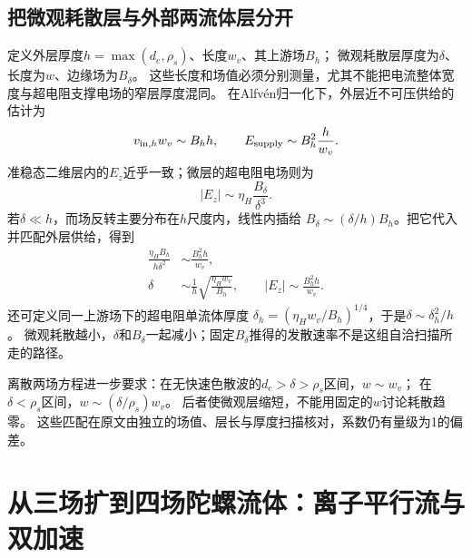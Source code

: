 \documentclass[UTF8,a4paper,11pt,openany,fontset=fandol]{ctexbook}
\begin{document}
\subsection{把微观耗散层与外部两流体层分开}
定义外层厚度$h=\max(d_e,\rho_s)$、长度$w_v$、其上游场$B_h$；
微观耗散层厚度为$\delta$、长度为$w$、边缘场为$B_\delta$。
这些长度和场值必须分别测量，尤其不能把电流整体宽度与超电阻支撑电场的窄层厚度混同。
在Alfvén归一化下，外层近不可压供给的估计为
\begin{equation}
 v_{{\rm in},h}w_v\sim B_hh,\qquad
 E_{\rm supply}\sim B_h^2\frac h{w_v}.
\end{equation}
准稳态二维层内的$E_z$近乎一致；微层的超电阻电场则为
\begin{equation}
 |E_z|\sim\eta_H\frac{B_\delta}{\delta^3}.
\end{equation}
若$\delta\ll h$，而场反转主要分布在$h$尺度内，线性内插给
$B_\delta\sim(\delta/h)B_h$。把它代入并匹配外层供给，得到
\begin{align}
 \frac{\eta_HB_h}{h\delta^2}&\sim\frac{B_h^2h}{w_v},\\
 \delta&\sim\frac1h\sqrt{\frac{\eta_Hw_v}{B_h}},\qquad
 |E_z|\sim\frac{B_h^2h}{w_v}.
 \label{eq:two_layer_rate}
\end{align}
还可定义同一上游场下的超电阻单流体厚度
$\delta_h=(\eta_Hw_v/B_h)^{1/4}$，于是$\delta\sim\delta_h^2/h$。
微观耗散越小，$\delta$和$B_\delta$一起减小；固定$B_\delta$推得的发散速率不是这组自洽扫描所走的路径。

离散两场方程进一步要求：在无快速色散波的$d_e>\delta>\rho_s$区间，$w\sim w_v$；
在$\delta<\rho_s$区间，$w\sim(\delta/\rho_s)w_v$。
后者使微观层缩短，不能用固定的$w$讨论耗散趋零。
这些匹配在原文由独立的场值、层长与厚度扫描核对，系数仍有量级为1的偏差。


\section{从三场扩到四场陀螺流体：离子平行流与双加速}
\end{document}
